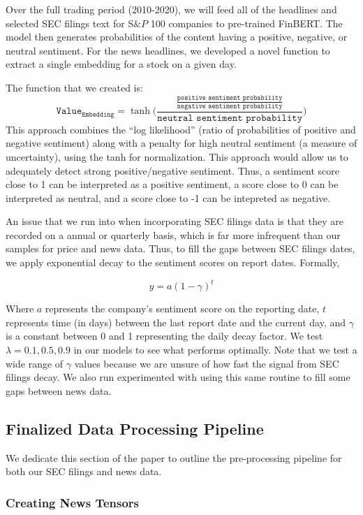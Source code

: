 Over the full trading period (2010-2020), we will feed all of the headlines and selected SEC filings text for S$\&P$ 100 companies to pre-trained FinBERT. 
The model then generates probabilities of the content having a positive, negative, or neutral sentiment. For the news headlines, we developed a novel function to extract a single embedding for a stock on a given day. 

The function that we created is:
\[\texttt{Value}_{\texttt{Embedding}} = \tanh\Biggl( \frac{\frac{\texttt{positive sentiment probability}}{\texttt{negative sentiment probability}}}{\texttt{neutral sentiment probability}} \Biggr)\]
This approach combines the “log likelihood” (ratio of probabilities of positive and 
negative sentiment) along with a penalty for high neutral sentiment (a measure of 
uncertainty), using the tanh for normalization. This approach would allow us to 
adequately detect strong positive/negative sentiment. Thus, a sentiment score close to 1 can be interpreted as a positive sentiment, a score close to 0 can be interpreted as neutral, and a score close to -1 can be intepreted as negative.

An issue that we run into when incorporating SEC filings data is that they are recorded on a annual or quarterly basis, which is far more infrequent than our samples for price and news data.
Thus, to fill the gaps between SEC filings dates, we apply exponential decay to the sentiment scores on report dates. Formally,

$$
y = a(1 - \gamma)^t
$$

Where $a$ represents the company's sentiment score on the reporting date, $t$ represents time (in days) between the last report date and the current day, and $\gamma$ is a constant between 0 and 1 representing the daily decay factor. We test $\lambda = 0.1, 0.5, 0.9$ in our models to see what performs optimally. Note that we test a wide range of $\gamma$ values because we are unsure of how fast the signal from SEC filings decay. We also run experimented with using this same routine to fill some gaps between news data.
 
\subsection{Finalized Data Processing Pipeline}
We dedicate this section of the paper to outline the pre-processing pipeline for both our SEC filings and news data.

\subsubsection{Creating News Tensors}\label{newstensors}

